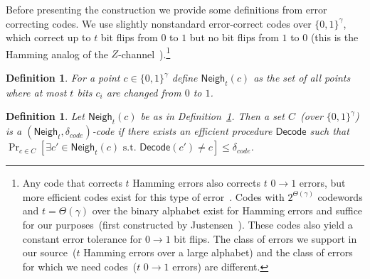\documentclass[11pt]{article}
\newcommand{\defref}[1]{\mbox{Definition~\ref{#1}}}
\newcommand{\class}[1]{{\ensuremath{\mathsf{#1}}}}
\newcommand{\zo}{\ensuremath{\{0, 1\}}}
\newcommand{\neigh}{\ensuremath{\class{Neigh}}\xspace}
\newcommand{\decode}{\ensuremath{\mathsf{Decode}}}
\newtheorem{definition}[theorem]{Definition}
\begin{document}
Before presenting the construction we provide some definitions from error correcting codes.
We use slightly nonstandard error-correct codes over $\{0,1\}^\gamma$, which correct up to $t$ bit flips from $0$ to $1$ but no bit flips from $1$ to $0$ (this is the Hamming analog of the $Z$-channel~\cite{tallini2002capacity}).\footnote{Any code that corrects $t$ Hamming errors also corrects $t$ $0\rightarrow 1$ errors, but more efficient codes  exist for this type of error~\cite{tallini2002capacity}.
Codes with $2^{\Theta(\gamma)}$ codewords and $t = \Theta(\gamma)$ over the binary alphabet exist for Hamming errors and suffice for our purposes~(first constructed by Justensen~\cite{justesen1972class}).  These codes also yield a constant error tolerance for $0\rightarrow 1$ bit flips.
The class of errors we support in our source~($t$ Hamming errors over a large alphabet) and the class of errors for which we need codes~($t$ $0\rightarrow 1$ errors) are different.
}
\begin{definition}
\label{def:hamming z channel}
For a point $c\in \zo^\gamma$ define $\neigh_t(c) $ as the set of all points where at most $t$ bits $c_i$ are changed from $0$ to $1$.
\end{definition}

\begin{definition}
Let $\neigh_t(c)$ be as in \defref{def:hamming z channel}.  Then a set $C$~(over $\zo^\gamma$) is a $(\neigh_t, \delta_{code})$-code if there exists an efficient procedure $\decode$ such that $\Pr_{c\in C}[\exists c'\in \neigh_t(c) \text{ s.t. } \decode(c') \neq c] \leq \delta_{code}$.
\end{definition}
\end{document}
